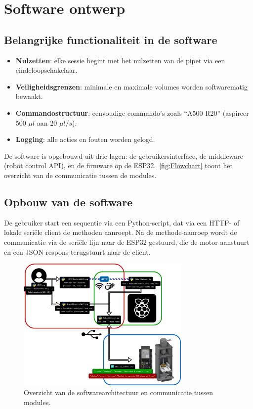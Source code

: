 \section{Software ontwerp}
\subsection{Belangrijke functionaliteit in de software}
\begin{itemize}
\item \textbf{Nulzetten}: elke sessie begint met het nulzetten van de pipet via een eindeloopschakelaar.
\item \textbf{Veiligheidsgrenzen}: minimale en maximale volumes worden softwarematig bewaakt.
\item \textbf{Commandostructuur}: eenvoudige commando’s zoals ``A500 R20'' (aspireer 500 $\mu l$ aan 20 $\mu l/s$).
\item \textbf{Logging}: alle acties en fouten worden gelogd.
\end{itemize}
De software is opgebouwd uit drie lagen: de gebruikersinterface, de middleware (robot control API), en de firmware op de ESP32.\ \autoref{fig:Flowchart} toont het overzicht van de communicatie tussen de modules.

\subsection{Opbouw van de software}
De gebruiker start een sequentie via een Python-script, dat via een HTTP- of lokale seriële client de methoden aanroept. Na de methode-aanroep wordt de communicatie via de seriële lijn naar de ESP32 gestuurd, die de motor aanstuurt en een JSON-respons terugstuurt naar de client.


\begin{figure}[H] 
    \centering 
    \includegraphics[width=0.75\textwidth]{figures/Flowchart.png} 
    \caption{Overzicht van de softwarearchitectuur en communicatie tussen modules.}\label{fig:Flowchart} 
\end{figure}

